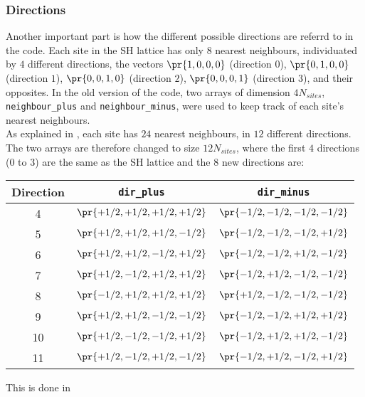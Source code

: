 \subsubsection{Directions}
Another important part is how the different possible directions are referrd to in the code.
Each site in the SH lattice has only $8$ nearest neighbours, individuated by $4$ different directions, the vectors $\pr{1,0,0,0}$ (direction $0$), $\pr{0,1,0,0}$ (direction $1$), $\pr{0,0,1,0}$ (direction $2$), $\pr{0,0,0,1}$ (direction $3$), and their opposites.
In the old version of the code, two arrays of dimension $4N_{sites}$, \texttt{neighbour\_plus} and \texttt{neighbour\_minus}, were used to keep track of each site's nearest neighbours.\\
As explained in , each site has $24$ nearest neighbours, in $12$ different directions.
The two arrays are therefore changed to size $12N_{sites}$, where the first $4$ directions ($0$ to $3$) are the same as the SH lattice and the $8$ new directions are:
\begin{center}
\begin{tabular}{ |c|c|c| }
    \hline
    Direction & \texttt{dir\_plus}  & \texttt{dir\_minus}  \\\hline\hline
    4  & $\pr{+1/2,+1/2,+1/2,+1/2}$ & $\pr{-1/2,-1/2,-1/2,-1/2}$ \\\hline
    5  & $\pr{+1/2,+1/2,+1/2,-1/2}$ & $\pr{-1/2,-1/2,-1/2,+1/2}$ \\\hline
    6  & $\pr{+1/2,+1/2,-1/2,+1/2}$ & $\pr{-1/2,-1/2,+1/2,-1/2}$ \\\hline
    7  & $\pr{+1/2,-1/2,+1/2,+1/2}$ & $\pr{-1/2,+1/2,-1/2,-1/2}$ \\\hline
    8  & $\pr{-1/2,+1/2,+1/2,+1/2}$ & $\pr{+1/2,-1/2,-1/2,-1/2}$ \\\hline
    9  & $\pr{+1/2,+1/2,-1/2,-1/2}$ & $\pr{-1/2,-1/2,+1/2,+1/2}$ \\\hline
    10 & $\pr{+1/2,-1/2,-1/2,+1/2}$ & $\pr{-1/2,+1/2,+1/2,-1/2}$ \\\hline
    11 & $\pr{+1/2,-1/2,+1/2,-1/2}$ & $\pr{-1/2,+1/2,-1/2,+1/2}$ \\\hline
\end{tabular}
\end{center}
This is done in

